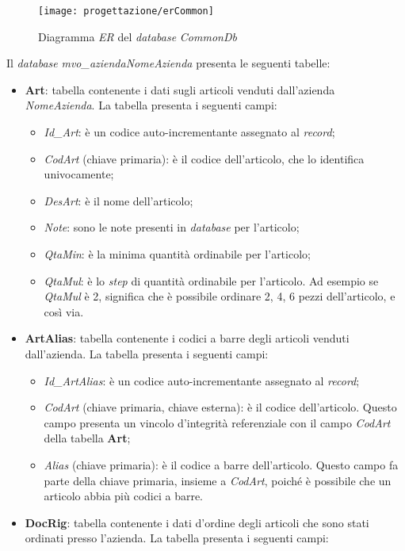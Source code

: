\begin{figure}[!h] 
    \centering 
    \texttt{[image: progettazione/erCommon]} 
    \caption{Diagramma \textit{ER} del \textit{database} \textit{CommonDb}}
\end{figure}

\newpage

Il \textit{database} \textit{mvo\_aziendaNomeAzienda} presenta le seguenti tabelle:
\begin{itemize}
	\item \textbf{Art}: tabella contenente i dati sugli articoli venduti dall'azienda \textit{NomeAzienda}. La tabella presenta i seguenti campi:
		\begin{itemize}
			\item \textit{Id\_Art}: è un codice auto-incrementante assegnato al \textit{record};
			\item \textit{CodArt} (chiave primaria): è il codice dell'articolo, che lo identifica univocamente;
			\item \textit{DesArt}: è il nome dell'articolo;
			\item \textit{Note}: sono le note presenti in \textit{database} per l'articolo;
			\item \textit{QtaMin}: è la minima quantità ordinabile per l'articolo;
			\item \textit{QtaMul}: è lo \textit{step} di quantità ordinabile per l'articolo. Ad esempio se \textit{QtaMul} è 2, significa che è possibile ordinare 2, 4, 6 pezzi dell'articolo, e così via.
		\end{itemize}
	\item \textbf{ArtAlias}: tabella contenente i codici a barre degli articoli venduti dall'azienda. La tabella presenta i seguenti campi:
		\begin{itemize}
			\item \textit{Id\_ArtAlias}: è un codice auto-incrementante assegnato al \textit{record};
			\item \textit{CodArt} (chiave primaria, chiave esterna): è il codice dell'articolo. Questo campo presenta un vincolo d'integrità referenziale con il campo \textit{CodArt} della tabella \textbf{Art};
			\item \textit{Alias} (chiave primaria): è il codice a barre dell'articolo. Questo campo fa parte della chiave primaria, insieme a \textit{CodArt}, poiché è possibile che un articolo abbia più codici a barre.
		\end{itemize}
	\item \textbf{DocRig}: tabella contenente i dati d'ordine degli articoli che sono stati ordinati presso l'azienda. La tabella presenta i seguenti campi:

\end{itemize}
